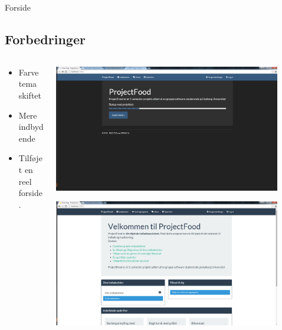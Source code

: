 \begin{frame}{Forside}
	\subsection{Forbedringer}
	
	\begin{minipage}[0.3\textheight]{\textwidth}
	\begin{columns}[T]
	\begin{column}{0.5\textwidth}
	\begin{itemize}
	\item Farve tema skiftet
	\item Mere indbydende
	\item Tilføjet en reel forside.
	
	\end{itemize}
	\end{column}
	\begin{column}{0.5\textwidth}
	 \includegraphics[width=0.9\textwidth,height=0.8\textheight,keepaspectratio]{images/Screenshots/FrontPageOld.png}
	 
	 \vspace{2 mm}
	  
	  \includegraphics[width=0.9\textwidth,height=0.8\textheight,keepaspectratio]{images/Screenshots/FrontPage.png}
	\end{column}
	\end{columns}
	

  \end{minipage}
	
\end{frame}

